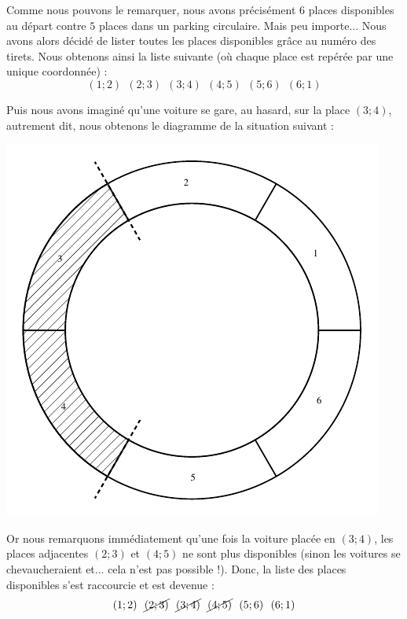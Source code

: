 \documentclass[a4paper,francais,11pt]{article}
\begin{document}
Comme nous pouvons le remarquer, nous avons précisément $6$ places disponibles au départ contre $5$ places dans un parking circulaire. Mais peu importe... Nous avons alors décidé de lister toutes les places disponibles grâce au numéro des tirets. Nous obtenons ainsi la liste suivante (où chaque place est repérée par une unique coordonnée) :
\[(1;2)\ \ (2;3)\ \ (3;4)\ \ (4;5)\ \ (5;6)\ \ (6;1)\]

Puis nous avons imaginé qu'une voiture se gare, au hasard, sur la place $(3;4)$, autrement dit, nous obtenons le diagramme de la situation suivant :
\begin{center}
\includegraphics{fig2.pdf}
\end{center}

Or nous remarquons immédiatement qu'une fois la voiture placée en $(3;4)$, les places adjacentes $(2;3)$ et $(4;5)$ ne sont plus disponibles (sinon les voitures se chevaucheraient et... cela n'est pas possible !). Donc, la liste des places disponibles s'est raccourcie et est devenue :
\[(1;2)\ \ \cancel{(2;3)}\ \ \cancel{(3;4)}\ \ \cancel{(4;5)}\ \ (5;6)\ \ (6;1)\]
\end{document}
